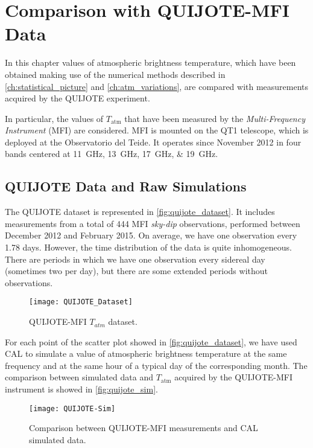\chapter{Comparison with QUIJOTE-MFI Data}\label{ch:comparison_quijote}

In this chapter values of atmospheric brightness temperature, which have
been obtained making use of the numerical methods described in
\autoref{ch:statistical_picture} and \autoref{ch:atm_variations}, are
compared with measurements acquired by the QUIJOTE experiment.

In particular, the values of $T_\text{atm}$ that have been measured by the
\emph{Multi-Frequency Instrument} (MFI) are considered. MFI is mounted on
the QT1 telescope, which is deployed at the Observatorio del Teide. It
operates since November 2012 in four bands centered at
\SIlist{11;13;17;19}{\giga\hertz}.

\section{QUIJOTE Data and Raw Simulations}

The QUIJOTE dataset is represented in \autoref{fig:quijote_dataset}.
It includes measurements from a total of \num{444} MFI \emph{sky-dip}
observations, performed between December 2012 and February 2015.  On
average, we have one observation every \num{1.78} days. However, the time
distribution of the data is quite inhomogeneous. There are periods in which
we have one observation every sidereal day (sometimes two per day), but
there are some extended periods without observations.

\begin{figure}
        \centering
        \texttt{[image: QUIJOTE\_Dataset]}
        \caption{QUIJOTE-MFI  $T_{atm}$ dataset.}
        \label{fig:quijote_dataset}
\end{figure}

For each point of the scatter plot showed in \autoref{fig:quijote_dataset},
we have used CAL to simulate a value of atmospheric brightness temperature
at the same frequency and at the same hour of a typical day of the
corresponding month. The comparison between simulated data and
$T_\text{atm}$ acquired by the QUIJOTE-MFI instrument is showed in
\autoref{fig:quijote_sim}.

\begin{figure}
        \centering
        \texttt{[image: QUIJOTE-Sim]}
        \caption{Comparison between QUIJOTE-MFI measurements and CAL
        simulated data.}
        \label{fig:quijote_sim}
\end{figure}

